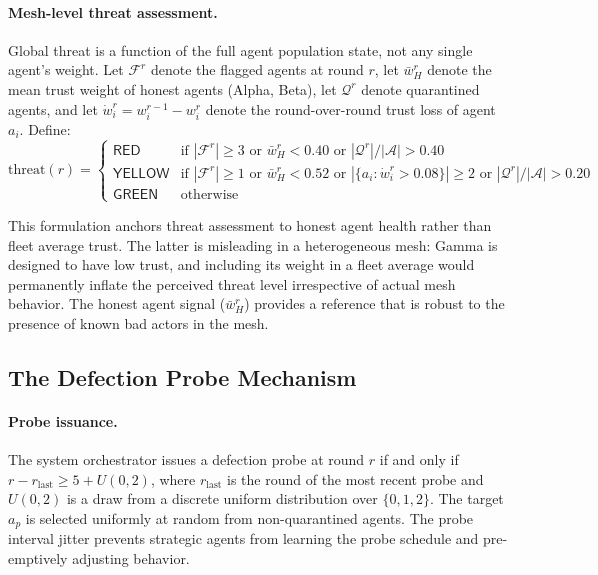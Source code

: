 \paragraph{Mesh-level threat assessment.}
Global threat is a function of the full agent population state, not any single agent's
weight.  Let $\mathcal{F}^r$ denote the flagged agents at round $r$, let
$\bar{w}_H^r$ denote the mean trust weight of honest agents (Alpha, Beta), let
$\mathcal{Q}^r$ denote quarantined agents, and let $\dot{w}_i^r = w_i^{r-1} - w_i^r$
denote the round-over-round trust loss of agent $a_i$.  Define:
\[
\text{threat}(r) = \begin{cases}
\mathsf{RED} & \text{if } |\mathcal{F}^r| \geq 3 \text{ or } \bar{w}_H^r < 0.40
               \text{ or } |\mathcal{Q}^r|/|\mathcal{A}| > 0.40 \\
\mathsf{YELLOW} & \text{if } |\mathcal{F}^r| \geq 1 \text{ or } \bar{w}_H^r < 0.52
                  \text{ or } |\{a_i : \dot{w}_i^r > 0.08\}| \geq 2
                  \text{ or } |\mathcal{Q}^r|/|\mathcal{A}| > 0.20 \\
\mathsf{GREEN} & \text{otherwise}
\end{cases}
\]

This formulation anchors threat assessment to honest agent health rather than fleet
average trust.  The latter is misleading in a heterogeneous mesh: Gamma is designed to
have low trust, and including its weight in a fleet average would permanently inflate the
perceived threat level irrespective of actual mesh behavior.  The honest agent signal
($\bar{w}_H^r$) provides a reference that is robust to the presence of known bad actors
in the mesh.

\subsection{The Defection Probe Mechanism}
\label{sec:probe}

\paragraph{Probe issuance.}
The system orchestrator issues a defection probe at round $r$ if and only if
$r - r_{\text{last}} \geq 5 + U(0, 2)$, where $r_{\text{last}}$ is the round of the
most recent probe and $U(0, 2)$ is a draw from a discrete uniform distribution over
$\{0, 1, 2\}$.  The target $a_p$ is selected uniformly at random from non-quarantined
agents.  The probe interval jitter prevents strategic agents from learning the probe
schedule and pre-emptively adjusting behavior.

